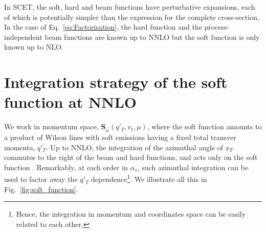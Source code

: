 \documentclass{appolb}
\newcommand{\Bf}[1]{\mathbf{#1}}
\begin{document}
In SCET, the  soft, hard and beam functions have perturbative expansions, each of which  is potentially simpler than the expression for the 
complete cross-section. In the case of Eq.~\eqref{eq:Factorisation}, the hard function and the process-independent beam functions \cite{Gehrmann:2012ze,Gehrmann:2014yya} are known up to NNLO but the soft function is only known up to NLO\cite{Li:2013mia}.

\section{Integration strategy of the soft function at NNLO}


We work in momentum space,  $ \Bf{S}_{i\bar{i}}(q'_T, v_t ,\mu)$, where the soft function amounts to a product of Wilson lines with soft emissions having a fixed total transver momenta, $q'_T$. Up to NNLO, the integration of the azimuthal angle of  $x_T$ commutes to the right of  the beam and hard functions,  and acts only on the soft function \cite{Li:2013mia}. Remarkably, at each order in $\alpha_s$, such azimuthal integration can be used to factor away the $q'_T$ dependence\footnote{Hence, the integration in momentum and coordinates space can be easily related to each other.}.  We illustrate all this in  Fig.~\ref{fig:soft_function}.
\end{document}
